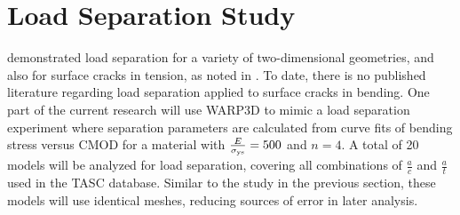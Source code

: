 \section{Load Separation Study}
\label{chap:load-separation}

\citet{sharobeamlandes1991,sharobeamlandes1994} demonstrated load separation for a variety of two-dimensional geometries, and also for surface cracks in tension, as noted in .
To date, there is no published literature regarding load separation applied to surface cracks in bending.
One part of the current research will use WARP3D to mimic a load separation experiment where separation parameters are calculated from curve fits of bending stress versus CMOD for a material with \(\frac{E}{\sigma_{\textnormal{ys}}}=500\) and \(n=4\).
A total of 20 models will be analyzed for load separation, covering all combinations of \(\frac{a}{c}\) and \(\frac{a}{t}\) used in the TASC database.
Similar to the \hone study in the previous section, these models will use identical meshes, reducing sources of error in later analysis.
